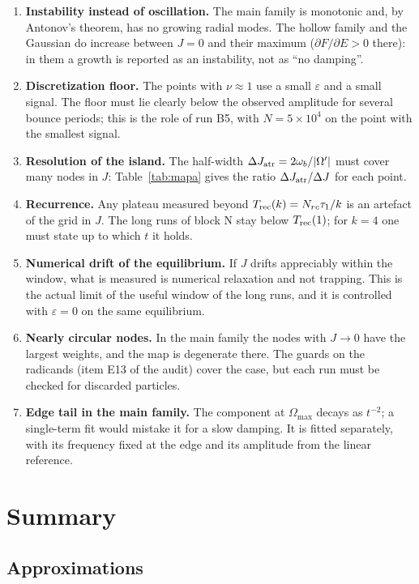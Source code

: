 \documentclass[11pt,a4paper]{article}
\begin{document}
\begin{enumerate}
\item \textbf{Instability instead of oscillation.} The main family is monotonic and, by
Antonov's theorem, has no growing radial modes. The hollow family and the Gaussian do
increase between $J=0$ and their maximum ($\partial F/\partial E>0$ there): in them a growth is
reported as an instability, not as ``no damping''.
\item \textbf{Discretization floor.} The points with $\nu\approx1$ use a small $\varepsilon$ and a small
signal. The floor must lie clearly below the observed amplitude for several bounce
periods; this is the role of run B5, with $N=5\times10^4$ on the point with the smallest
signal.
\item \textbf{Resolution of the island.} The half-width $\Delta J_{\rm atr}=2\omega_b/|\Omega'|$ must cover
many nodes in $J$: Table~\ref{tab:mapa} gives the ratio $\Delta J_{\rm atr}/\Delta J$ for each point.
\item \textbf{Recurrence.} Any plateau measured beyond $T_{\rm rec}(k)=N_{rc}\tau_1/k$ is an artefact
of the grid in $J$. The long runs of block N stay below $T_{\rm rec}(1)$; for $k=4$ one must
state up to which $t$ it holds.
\item \textbf{Numerical drift of the equilibrium.} If $J$ drifts appreciably within the
window, what is measured is numerical relaxation and not trapping. This is the actual
limit of the useful window of the long runs, and it is controlled with $\varepsilon=0$ on the same
equilibrium.
\item \textbf{Nearly circular nodes.} In the main family the nodes with $J\to0$ have the
largest weights, and the map is degenerate there. The guards on the radicands (item E13
of the audit) cover the case, but each run must be checked for discarded particles.
\item \textbf{Edge tail in the main family.} The component at $\Omega_{\max}$ decays as $t^{-2}$; a
single-term fit would mistake it for a slow damping. It is fitted separately, with its
frequency fixed at the edge and its amplitude from the linear reference.
\end{enumerate}

\section{Summary}
\label{sec:resumen}

\subsection{Approximations}
\label{sec:aproximaciones}
\end{document}
